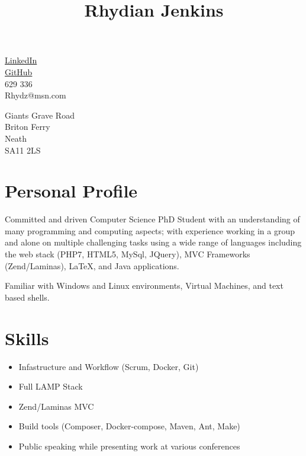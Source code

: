 \documentclass[10pt]{article}
\title{\bfseries\Huge Rhydian Jenkins}
\date{}
\author{}
\begin{document}
\maketitle \vspace{-7em}

\section*{}
\begin{minipage}{0.5\textwidth}
	\faLinkedin \quad \href{https://www.linkedin.com/in/rhydian-jenkins-30309085/}{LinkedIn}\\
	\faGithub \quad \href{https://github.com/RhydianJenkins}{GitHub}\\
	\faPhone {} 629 336\\
	\faEnvelope \quad Rhydz@msn.com
\end{minipage}
\begin{minipage}{0.5\textwidth}
    \begin{flushright}
	Giants Grave Road\\
	Briton Ferry\\
	Neath\\
    SA11 2LS
    \end{flushright}
\end{minipage}

\section*{Personal Profile}
\noindent Committed and driven Computer Science PhD Student with an understanding of many programming and computing aspects; with experience working in a group and alone on multiple challenging tasks using a wide range of languages including the web stack (PHP7, HTML5, MySql, JQuery), MVC Frameworks (Zend/Laminas), \LaTeX, and Java applications.

\noindent Familiar with Windows and Linux environments, Virtual Machines, and text based shells.

\section*{Skills}
\begin{itemize} \setlength\itemsep{-0.25em}
	\item Infastructure and Workflow (Scrum, Docker, Git)
	\item Full LAMP Stack
	\item Zend/Laminas MVC
	\item Build tools (Composer, Docker-compose, Maven, Ant, Make)
	\item Public speaking while presenting work at various conferences
\end{itemize}
\end{document}
